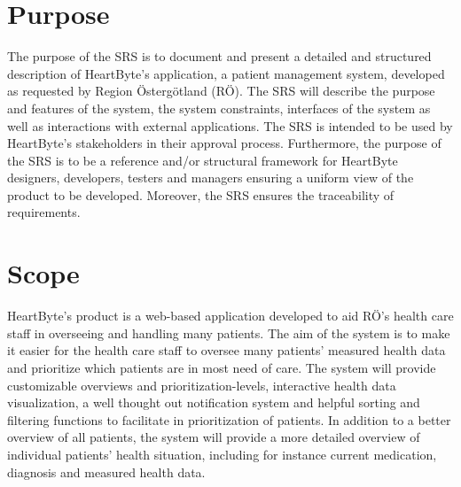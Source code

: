 \documentclass{scrreprt}
\begin{document}
\section{Purpose}
The purpose of the SRS is to document and present a detailed and structured description of HeartByte's application, a patient management system, developed as requested by Region Östergötland (RÖ). The SRS will describe the purpose and features of the system, the system constraints, interfaces of the system as well as interactions with external applications. The SRS is intended to be used by HeartByte’s stakeholders in their approval process. Furthermore, the purpose of the SRS is to be a reference and/or structural framework for HeartByte designers, developers, testers and managers ensuring a uniform view of the product to be developed. Moreover, the SRS ensures the traceability of requirements.

\section{Scope}
HeartByte's product is a web-based application developed to aid RÖ's health care staff in overseeing and handling many patients. The aim of the system is to make it easier for the health care staff to oversee many patients' measured health data and prioritize which patients are in most need of care. The system will provide customizable overviews and prioritization-levels, interactive health data visualization, a well thought out notification system and helpful sorting and filtering functions to facilitate in prioritization of patients. In addition to a better overview of all patients, the system will provide a more detailed overview of individual patients' health situation, including for instance current medication, diagnosis and measured health data.
\end{document}
